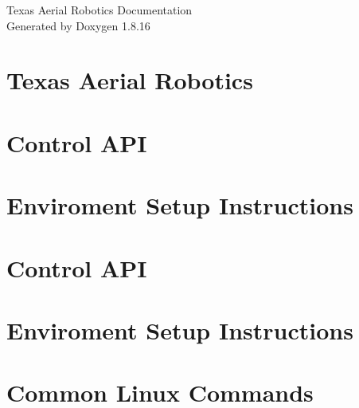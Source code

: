 \let\mypdfximage\pdfximage\def\pdfximage{\immediate\mypdfximage}\documentclass[twoside]{book}
\newcommand{\+}{\discretionary{\mbox{\scriptsize$\hookleftarrow$}}{}{}}
\newcommand{\clearemptydoublepage}{%
  \newpage{\pagestyle{empty}\cleardoublepage}%
}
\begin{document}
\hypersetup{pageanchor=false,
             bookmarksnumbered=true,
             pdfencoding=unicode
            }
\begin{titlepage}
\vspace*{7cm}
\begin{center}%
{\Large Texas Aerial Robotics Documentation }\\
\vspace*{1cm}
{\large Generated by Doxygen 1.8.16}\\
\end{center}
\end{titlepage}
\clearemptydoublepage
{}
\tableofcontents
\clearemptydoublepage
{}
\hypersetup{pageanchor=true}

\chapter{Texas Aerial Robotics}
\label{index}\hypertarget{index}{}
\chapter{Control A\+PI}
\label{md__home_eric_catkin_ws_src_Mission8_OutOfControls_docs_control_api_tutorial}

\chapter{Enviroment Setup Instructions}
\label{md__home_eric_catkin_ws_src_Mission8_OutOfControls_docs_enviorment_setup}

\chapter{Control A\+PI}
\label{md_control_api_tutorial}

\chapter{Enviroment Setup Instructions}
\label{md_enviorment_setup}

\chapter{Common Linux Commands}
\label{md_linux_commands}

\end{document}
